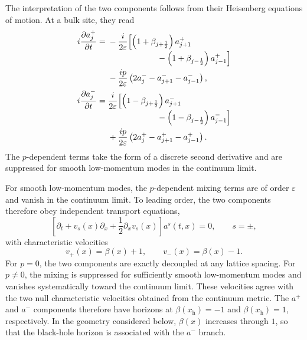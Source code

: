 \documentclass[reprint,amsmath,amssymb,aps,prb,floatfix,showkeys,superscriptaddress]{revtex4-2}
\begin{document}
The interpretation of the two components follows from their
Heisenberg equations of motion. At a bulk site, they read
\begin{subequations}
\label{eq:a_eom_lattice}
\begin{align}
  i\frac{\partial a_j^+}{\partial t}
  ={}&
  -\frac{i}{2\varepsilon}
  \Bigl[
    \left(
      1+\beta_{j+\frac12}
    \right)a_{j+1}^+
  \nonumber\\[-2pt]
  &\hspace{21mm}
    -
    \left(
      1+\beta_{j-\frac12}
    \right)a_{j-1}^+
  \Bigr]
  \nonumber\\
  &-
  \frac{i p}{2\varepsilon}
  \left(
    2a_j^-
    -a_{j+1}^-
    -a_{j-1}^-
  \right),
  \label{eq:a_plus_eom}
  \\
  i\frac{\partial a_j^-}{\partial t}
  ={}&
  \frac{i}{2\varepsilon}
  \Bigl[
    \left(
      1-\beta_{j+\frac12}
    \right)a_{j+1}^-
  \nonumber\\[-2pt]
  &\hspace{21mm}
    -
    \left(
      1-\beta_{j-\frac12}
    \right)a_{j-1}^-
  \Bigr]
  \nonumber\\
  &+
  \frac{i p}{2\varepsilon}
  \left(
    2a_j^+
    -a_{j+1}^+
    -a_{j-1}^+
  \right).
  \label{eq:a_minus_eom}
\end{align}
\end{subequations}
The $p$-dependent terms take the form of a discrete second
derivative and are suppressed for smooth low-momentum modes in the
continuum limit.

For smooth low-momentum modes, the $p$-dependent mixing terms are
of order $\varepsilon$ and vanish in the continuum limit. To leading
order, the two components therefore obey independent transport
equations,
\begin{equation}
  \left[
    \partial_t
    +v_s(x)\partial_x
    +\frac{1}{2}\partial_xv_s(x)
  \right]
  a^s(t,x)
  =
  0,
  \qquad
  s=\pm,
  \label{eq:continuum_transport}
\end{equation}
with characteristic velocities
\begin{equation}
  v_+(x)=\beta(x)+1,
  \qquad
  v_-(x)=\beta(x)-1.
  \label{eq:a_velocities}
\end{equation}
For $p=0$, the two components are exactly decoupled at any lattice
spacing. For $p\neq0$, the mixing is suppressed for sufficiently
smooth low-momentum modes and vanishes systematically toward the
continuum limit. These velocities agree with the two null
characteristic velocities obtained from the continuum metric. The
$a^+$ and $a^-$ components therefore have horizons at
$\beta(x_{\mathrm h})=-1$ and $\beta(x_{\mathrm h})=1$,
respectively. In the geometry considered below, $\beta(x)$ increases
through $1$, so that the black-hole horizon is associated with the
$a^-$ branch.
\end{document}
